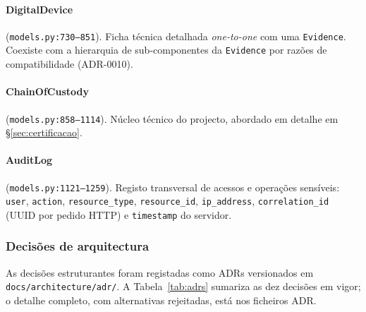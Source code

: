 \paragraph{DigitalDevice} (\texttt{models.py:730--851}). Ficha técnica
detalhada \emph{one-to-one} com uma \texttt{Evidence}. Coexiste com a
hierarquia de sub-componentes da \texttt{Evidence} por razões de
compatibilidade (ADR-0010).

\paragraph{ChainOfCustody} (\texttt{models.py:858--1114}). Núcleo
técnico do projecto, abordado em detalhe em \S\ref{sec:certificacao}.

\paragraph{AuditLog} (\texttt{models.py:1121--1259}). Registo
transversal de acessos e operações sensíveis: \texttt{user},
\texttt{action}, \texttt{resource\_type}, \texttt{resource\_id},
\texttt{ip\_address}, \texttt{correlation\_id} (UUID por pedido HTTP)
e \texttt{timestamp} do servidor.

\subsubsection{Decisões de arquitectura}
\label{sec:adrs}

As decisões estruturantes foram registadas como ADRs versionados em
\texttt{docs/architecture/adr/}. A Tabela~\ref{tab:adrs} sumariza as
dez decisões em vigor; o detalhe completo, com alternativas
rejeitadas, está nos ficheiros ADR.

